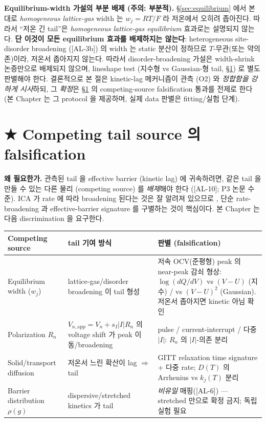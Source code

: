 \documentclass[11pt,a4paper]{article}
\newcommand{\app}{\mathrm{app}}
\newcommand{\AL}[1]{\textsf{[AL-#1]}}
\begin{document}
\textbf{Equilibrium-width 가설의 부분 배제 (주의: 부분적).} \S\ref{sec:equilibrium}
에서 본 대로 \emph{homogeneous lattice-gas} width 는 $w_j=RT/F$ 라 저온에서 오히려
좁아진다. 따라서 ``저온 긴 tail''은 \emph{homogeneous lattice-gas equilibrium} 효과로는
설명되지 않는다. \textbf{단 이것이 모든 equilibrium 효과를 배제하지는 않는다}:
heterogeneous site-disorder broadening (\AL{3b}) 의 width 는 static 분산이 정하므로
$T$-무관(또는 약의존)이라, 저온서 좁아지지 않는다. 따라서 disorder-broadening 가설은
width-shrink 논증만으로 배제되지 않으며, lineshape test (지수형 vs Gaussian-형 tail,
\S\ref{sec:falsify}) 로 별도 판별해야 한다. 결론적으로 본 절은 kinetic-lag 메커니즘이
관측 (O2) 와 \emph{정합함을 강하게 시사}하되, 그 \emph{확정}은 \S\ref{sec:falsify} 의
competing-source falsification 통과를 전제로 한다 (본 Chapter 는 그 protocol 을
제공하며, 실제 data 판별은 fitting/실험 단계).

\section{★ Competing tail source 의 falsification}\label{sec:falsify}
\textbf{왜 필요한가.} 관측된 tail 을 effective barrier (kinetic lag) 에 귀속하려면,
같은 tail 을 만들 수 있는 다른 물리 (competing source) 를 \emph{배제}해야 한다 (\AL{10};
P3 논문 수준). ICA 가 rate 에 따라 broadening 된다는 것은 잘 알려져 있으므로
\cite{dubarry2022,fly2020}, 단순 rate-broadening 과 effective-barrier signature 를
구별하는 것이 핵심이다. 본 Chapter 는 다음 discrimination 을 요구한다.

\begin{longtable}{p{} p{} p{}}
\toprule
Competing source & tail 기여 방식 & 판별 (falsification) \\ \midrule \endhead
Equilibrium width ($w_j$) & lattice-gas/disorder broadening 이 tail 형성 &
  저속 OCV(준평형) peak 의 near-peak 감쇠 형상: $\log(dQ/dV)$ vs $(V-U)$ (지수) /
  vs $(V-U)^2$ (Gaussian). 저온서 좁아지면 kinetic 아님 확인 \\
Polarization $R_n$ & $V_{n,\app}=V_n+s_I|I|R_n$ 의 voltage shift 가 peak 이동/broadening &
  pulse / current-interrupt / 다중 $|I|$: $R_n$ 의 $|I|$-의존 분리 \\
Solid/transport diffusion & 저온서 느린 확산이 lag $\Rightarrow$ tail &
  GITT relaxation time signature + 다중 rate; $D(T)$ 의 Arrhenius vs $k_j(T)$ 분리 \\
Barrier distribution $\rho(g)$ & dispersive/stretched kinetics 가 tail \cite{plonka2001} &
  \emph{비유일} 매핑(\AL{6}) — stretched 만으로 확정 금지; 독립 실험 필요 \\
\bottomrule
\end{longtable}
\end{document}
